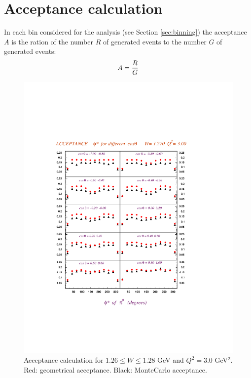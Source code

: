 \cia\vspace{-2 cm}
\section{Acceptance calculation}
In each bin considered for the analysis (see Section \ref{sec:binning})
the acceptance $A$ is the ration of the number $R$ of generated events 
to the number $G$ of generated events:
\begin{equation}
A=\frac{\displaystyle R}{\displaystyle G}
\end{equation}



\begin{figure}[h]
 \begin{center}
  \includegraphics[width=15cm, bb=0 120 540 640]{acceptance/img/acc_phi_W1.27_Q23.00}
  \caption[Comparison Geometrical and MonteCarlo acceptances, $1.26\le W\le 1.28$ GeV and $Q^2=3.0$ GeV$^2$ ]
          { Acceptance calculation for $1.26\le W\le 1.28$ GeV and $Q^2=3.0$ GeV$^2$. Red: geometrical 
	             acceptance. Black: MonteCarlo acceptance.}
 \label{fig:accept1}
  \end{center} 
\end{figure} 

